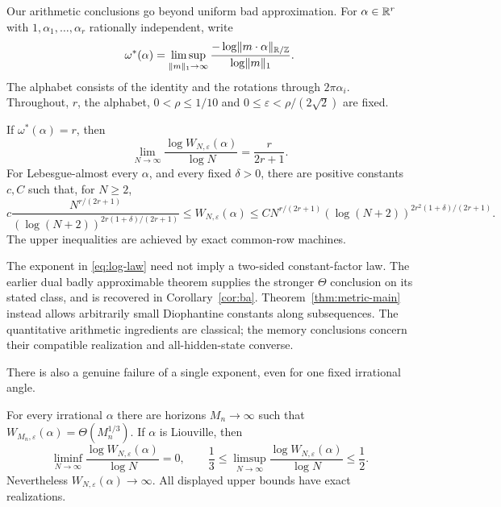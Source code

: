 Our arithmetic conclusions go beyond uniform bad approximation. For $\alpha\in\mathbb R^r$ with $1,\alpha_1,\ldots,\alpha_r$ rationally independent, write
\begin{equation}\label{eq:type-intro}
 \omega^*(\alpha)=\limsup_{\lVert m\rVert_1\to\infty}
       \frac{-\log\lVert m\cdot\alpha\rVert_{\mathbb R/\mathbb Z}}{\log\lVert m\rVert_1}.
\end{equation}
The alphabet consists of the identity and the rotations through $2\pi\alpha_i$. Throughout, $r$, the alphabet, $0<\rho\le1/10$ and
$0\le\varepsilon<\rho/(2\sqrt2)$ are fixed.

\begin{theorem}\label{thm:metric-main}
If $\omega^*(\alpha)=r$, then
\begin{equation}\label{eq:log-law}
 \lim_{N\to\infty}\frac{\log W_{N,\varepsilon}(\alpha)}{\log N}
                         =\frac{r}{2r+1}.
\end{equation}
For Lebesgue-almost every $\alpha$, and every fixed $\delta>0$, there are positive constants $c,C$ such that, for $N\ge2$,
\begin{equation}\label{eq:ae-log-bounds}
 c\frac{N^{r/(2r+1)}}{(\log(N+2))^{2r(1+\delta)/(2r+1)}}
 \le W_{N,\varepsilon}(\alpha)
 \le C N^{r/(2r+1)}(\log(N+2))^{2r^2(1+\delta)/(2r+1)}.
\end{equation}
The upper inequalities are achieved by exact common-row machines.
\end{theorem}

The exponent in \eqref{eq:log-law} need not imply a two-sided constant-factor law. The earlier dual badly approximable theorem supplies the stronger $\Theta$ conclusion on its stated class, and is recovered in Corollary~\ref{cor:ba}. Theorem~\ref{thm:metric-main} instead allows arbitrarily small Diophantine constants along subsequences. The quantitative arithmetic ingredients are classical; the memory conclusions concern their compatible realization and all-hidden-state converse.

There is also a genuine failure of a single exponent, even for one fixed irrational angle.
\begin{theorem}\label{thm:liouville-main}
For every irrational $\alpha$ there are horizons $M_n\to\infty$ such that
$W_{M_n,\varepsilon}(\alpha)=\Theta(M_n^{1/3})$. If $\alpha$ is Liouville, then
\begin{equation}\label{eq:liouville-summary}
 \liminf_{N\to\infty}\frac{\log W_{N,\varepsilon}(\alpha)}{\log N}=0,
 \qquad
 \frac13\le\limsup_{N\to\infty}\frac{\log W_{N,\varepsilon}(\alpha)}{\log N}
 \le\frac12.
\end{equation}
Nevertheless $W_{N,\varepsilon}(\alpha)\to\infty$. All displayed upper bounds have exact realizations.
\end{theorem}

